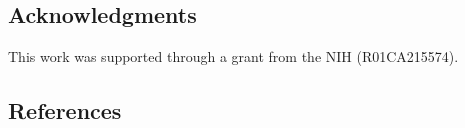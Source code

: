 \documentclass[
]{article}
\begin{document}
\hypertarget{acknowledgments}{%
\subsection{Acknowledgments}\label{acknowledgments}}

This work was supported through a grant from the NIH (R01CA215574).

\newpage

\hypertarget{references}{%
\subsection{References}\label{references}}

\setlength{\parindent}{-0.25in}
\setlength{\leftskip}{0.25in}

\noindent
\end{document}
